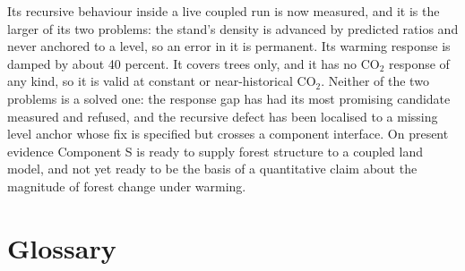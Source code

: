\documentclass[11pt]{article}
\begin{document}
Its recursive behaviour inside a live coupled run is now measured, and it is the larger of its two problems: the stand's density is advanced by predicted ratios and never anchored to a level, so an error in it is permanent. Its warming response is damped by about 40 percent. It covers trees only, and it has no CO$_2$ response of any kind, so it is valid at constant or near-historical CO$_2$. Neither of the two problems is a solved one: the response gap has had its most promising candidate measured and refused, and the recursive defect has been localised to a missing level anchor whose fix is specified but crosses a component interface. On present evidence Component S is ready to supply forest structure to a coupled land model, and not yet ready to be the basis of a quantitative claim about the magnitude of forest change under warming.

\newpage
\section*{Glossary}
\end{document}
